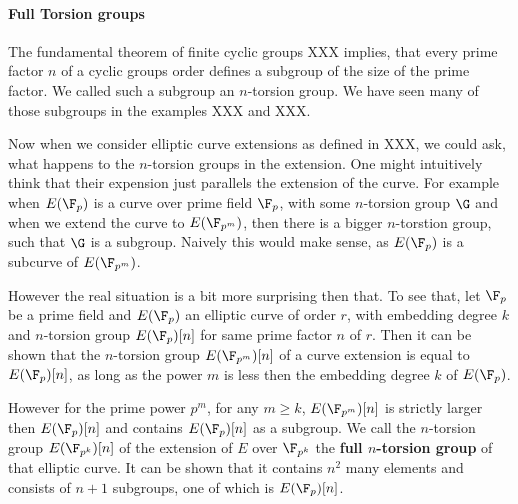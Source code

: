 \paragraph{Full Torsion groups} The fundamental theorem of finite cyclic groups XXX implies, that every prime factor $n$ of a cyclic groups order defines a subgroup of the size of the prime factor. We called such a subgroup an $n$-torsion group. We have seen many of those subgroups in the examples XXX and XXX.

Now when we consider elliptic curve extensions as defined in XXX, we could ask, what happens to the $n$-torsion groups in the extension. One might intuitively think that their expension just parallels the extension of the curve. For example when $E(\F_p)$ is a curve over prime field $\F_p$, with some $n$-torsion group $\G$ and when we extend the curve to $E(\F_{p^m})$, then there is a bigger $n$-torstion group, such that $\G$ is a subgroup. Naively this would make sense, as $E(\F_p)$ is a subcurve of $E(\F_{p^m})$. 

However the real situation is a bit more surprising then that. To see that, let $\F_p$ be a prime field and $E(\F_p)$ an elliptic curve of order $r$, with embedding degree $k$ and $n$-torsion group $E(\F_p)[n]$ for same prime factor $n$ of $r$. Then it can be shown that the $n$-torsion group $E(\F_{p^m})[n]$ of a curve extension is equal to $E(\F_p)[n]$, as long as the power $m$ is less then the embedding degree $k$ of $E(\F_p)$. 

However for the prime power $p^m$, for any $m\geq k$, $E(\F_{p^m})[n]$ is strictly larger then $E(\F_p)[n]$ and contains $E(\F_p)[n]$ as a subgroup. We call the $n$-torsion group $E(\F_{p^k})[n]$ of the extension of $E$ over $\F_{p^k}$ the \textbf{full $n$-torsion group} of that elliptic curve. It can be shown that it contains $n^2$ many elements and consists of $n+1$ subgroups, one of which is $E(\F_{p})[n]$.


